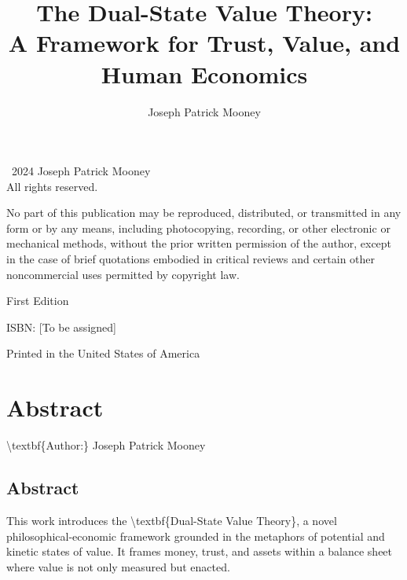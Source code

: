 \documentclass[11pt,oneside]{book}
\title{The Dual-State Value Theory:\\A Framework for Trust, Value, and Human Economics}
\author{Joseph Patrick Mooney}
\date{}
\begin{document}
\maketitle
\thispagestyle{empty}

\newpage
\thispagestyle{empty}
\vspace*{\fill}
\begin{center}
\textcopyright\ 2024 Joseph Patrick Mooney\\
All rights reserved.\\

\vspace{1em}

No part of this publication may be reproduced, distributed, or transmitted in any form or by any means, including photocopying, recording, or other electronic or mechanical methods, without the prior written permission of the author, except in the case of brief quotations embodied in critical reviews and certain other noncommercial uses permitted by copyright law.

\vspace{2em}

First Edition

\vspace{2em}

ISBN: [To be assigned]

\vspace{2em}

Printed in the United States of America
\end{center}
\vspace*{\fill}

\newpage
\tableofcontents

\chapter*{Abstract}


\textbackslash textbf\{Author:\} Joseph Patrick Mooney

\section{Abstract}

This work introduces the \textbackslash textbf\{Dual-State Value Theory\}, a novel philosophical-economic framework grounded in the metaphors of potential and kinetic states of value. It frames money, trust, and assets within a balance sheet where value is not only measured but enacted. 
\end{document}

